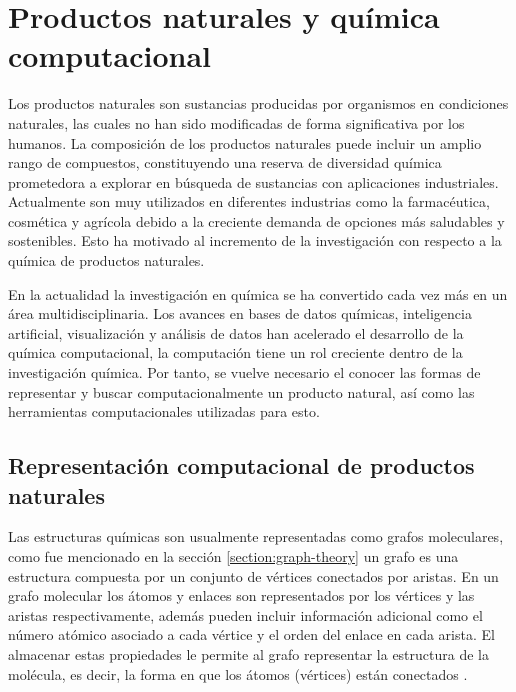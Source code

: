 \section{Productos naturales y química computacional}

Los productos naturales son sustancias producidas por organismos en condiciones naturales, las cuales no han sido modificadas de forma significativa por los humanos. 
La composición de los productos naturales puede incluir un amplio rango de compuestos, constituyendo una reserva de diversidad química prometedora a explorar en búsqueda de sustancias con aplicaciones industriales. 
Actualmente son muy utilizados en diferentes industrias como la farmacéutica, cosmética y agrícola debido a la creciente demanda de opciones más saludables y sostenibles. 
Esto ha motivado al incremento de la investigación con respecto a la química de productos naturales.

En la actualidad la investigación en química se ha convertido cada vez más en un área multidisciplinaria. 
Los avances en bases de datos químicas, inteligencia artificial, visualización y análisis de datos han acelerado el desarrollo de la química computacional, 
la computación tiene un rol creciente dentro de la investigación química. 
Por tanto, se vuelve necesario el conocer las formas de representar y buscar computacionalmente un producto natural, 
así como las herramientas computacionales utilizadas para esto.

\subsection{Representación computacional de productos naturales}

Las estructuras químicas son usualmente representadas como grafos moleculares, 
como fue mencionado en la sección \ref{section:graph-theory} un grafo es una estructura compuesta por un conjunto de vértices conectados por aristas. 
En un grafo molecular los átomos y enlaces son representados por los vértices y las aristas respectivamente, 
además pueden incluir información adicional como el número atómico asociado a cada vértice y el orden del enlace en cada arista. 
El almacenar estas propiedades le permite al grafo representar la estructura de la molécula, es decir, la forma en que los átomos (vértices) están conectados \cite{leach2007introduction}.  

